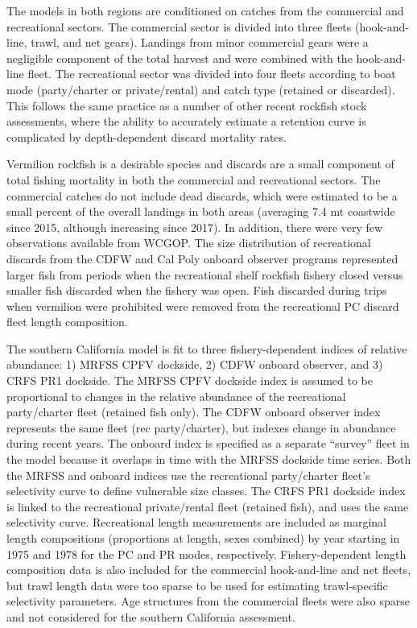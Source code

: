 \documentclass[
  english,
  a4paper,
]{article}
\begin{document}
The models in both regions are conditioned on catches from the commercial and recreational sectors. The commercial sector is divided into three fleets (hook-and-line, trawl, and net gears). Landings from minor commercial gears were a negligible component of the total harvest and were combined with the hook-and-line fleet. The recreational sector was divided into four fleets according to boat mode (party/charter or private/rental) and catch type (retained or discarded). This follows the same practice as a number of other recent rockfish stock assessments, where the ability to accurately estimate a retention curve is complicated by depth-dependent discard mortality rates.

Vermilion rockfish is a desirable species and discards are a small component of total fishing mortality in both the commercial and recreational sectors. The commercial catches do not include dead discards, which were estimated to be a small percent of the overall landings in both areas (averaging 7.4 mt coastwide since 2015, although increasing since 2017). In addition, there were very few observations available from WCGOP. The size distribution of recreational discards from the CDFW and Cal Poly onboard observer programs represented larger fish from periods when the recreational shelf rockfish fishery closed versus smaller fish discarded when the fishery was open. Fish discarded during trips when vermilion were prohibited were removed from the recreational PC discard fleet length composition.

The southern California model is fit to three fishery-dependent indices of relative abundance: 1) MRFSS CPFV dockside, 2) CDFW onboard observer, and 3) CRFS PR1 dockside. The MRFSS CPFV dockside index is assumed to be proportional to changes in the relative abundance of the recreational party/charter fleet (retained fish only). The CDFW onboard observer index represents the same fleet (rec party/charter), but indexes change in abundance during recent years. The onboard index is specified as a separate ``survey'' fleet in the model because it overlaps in time with the MRFSS dockside time series. Both the MRFSS and onboard indices use the recreational party/charter fleet's selectivity curve to define vulnerable size classes. The CRFS PR1 dockside index is linked to the recreational private/rental fleet (retained fish), and uses the same selectivity curve. Recreational length measurements are included as marginal length compositions (proportions at length, sexes combined) by year starting in 1975 and 1978 for the PC and PR modes, respectively. Fishery-dependent length composition data is also included for the commercial hook-and-line and net fleets, but trawl length data were too sparse to be used for estimating trawl-specific selectivity parameters. Age structures from the commercial fleets were also sparse and not considered for the southern California assessment.
\end{document}
